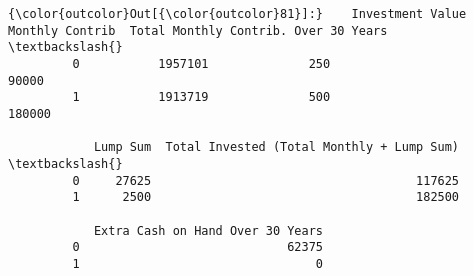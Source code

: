 \documentclass[11pt]{article}
\begin{document}
\begin{Verbatim}[commandchars=\\\{\}]
{\color{outcolor}Out[{\color{outcolor}81}]:}    Investment Value  Monthly Contrib  Total Monthly Contrib. Over 30 Years  \textbackslash{}
         0           1957101              250                                 90000   
         1           1913719              500                                180000   
         
            Lump Sum  Total Invested (Total Monthly + Lump Sum)  \textbackslash{}
         0     27625                                     117625   
         1      2500                                     182500   
         
            Extra Cash on Hand Over 30 Years  
         0                             62375  
         1                                 0  
\end{Verbatim}
            
\end{document}
